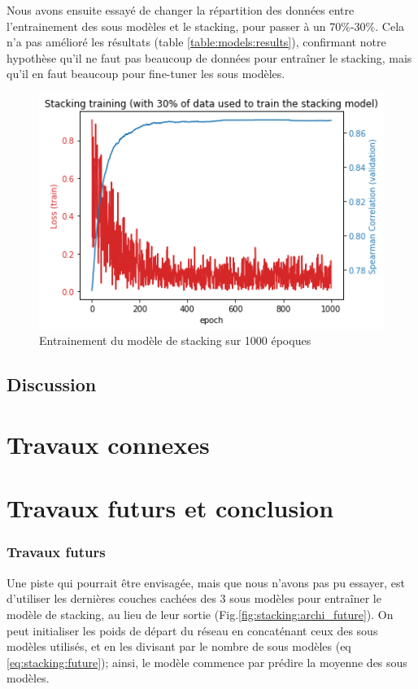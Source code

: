 \documentclass[11pt,a4paper, french]{article}
\begin{document}
Nous avons ensuite essayé de changer la répartition des données entre l'entrainement des sous modèles et le stacking, pour passer à un 70\%-30\%. Cela n'a pas amélioré les résultats (table \ref{table:models:results}), confirmant notre hypothèse qu'il ne faut pas beaucoup de données pour entraîner le stacking, mais qu'il en faut beaucoup pour fine-tuner les sous modèles.

\begin{figure}
  \includegraphics[width=\linewidth]{resources/stack-30-training.png}
  \caption{Entrainement du modèle de stacking sur 1000 époques}
  \label{fig:stack:train}
\end{figure}

\subsection{Discussion}


\section{Travaux connexes}



\section{Travaux futurs et conclusion }

%
\subsubsection{Travaux futurs}

Une piste qui pourrait être envisagée, mais que nous n'avons pas pu essayer, est d'utiliser les dernières couches cachées des 3 sous modèles pour entraîner le modèle de stacking, au lieu de leur sortie (Fig.\ref{fig:stacking:archi_future}). On peut initialiser les poids de départ du réseau en concaténant ceux des sous modèles utilisés, et en les divisant par le nombre de sous modèles (eq \ref{eq:stacking:future}); ainsi, le modèle commence par prédire la moyenne des sous modèles.
\end{document}
